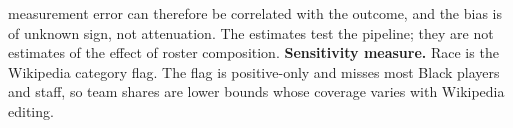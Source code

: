 \begin{table}[!h]
{\begin{threeparttable}
\begin{tablenotes}[para]
measurement error can therefore be correlated with the outcome, and the bias is of unknown sign, not attenuation. The estimates test the pipeline; they are not estimates of the effect of roster composition. \textbf{Sensitivity measure.} Race is the Wikipedia category flag. The flag is positive-only and misses most Black players and staff, so team shares are lower bounds whose coverage varies with Wikipedia editing.
\end{tablenotes}
\end{threeparttable}}
\end{table}
